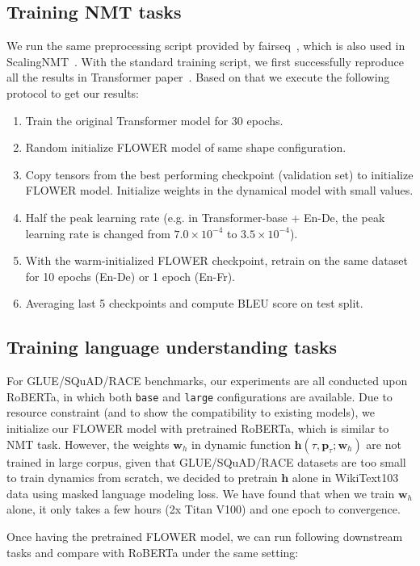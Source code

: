 \documentclass[11pt]{article}
\def\vh{{\bm{h}}}
\def\vp{{\bm{p}}}
\def\vw{{\bm{w}}}
\begin{document}
\subsection{Training NMT tasks}
We run the same preprocessing script provided by fairseq~\cite{ott2019fairseq}, which is also used in ScalingNMT~\cite{ott2018scaling}. With the standard training script, we first successfully reproduce all the results in Transformer paper~\cite{vaswani2017attention}. Based on that we execute the following protocol to get our results:
\begin{enumerate}
    \item Train the original Transformer model for 30 epochs.
    \item Random initialize FLOWER model of same shape configuration. 
    \item Copy tensors from the best performing checkpoint (validation set) to initialize FLOWER model. Initialize weights in the dynamical model with small values.
    \item Half the peak learning rate (e.g. in Transformer-base + En-De, the peak learning rate is changed from $7.0\times 10^{-4}$ to $3.5\times 10^{-4}$).
    \item With the warm-initialized FLOWER checkpoint, retrain on the same dataset for 10 epochs (En-De) or 1 epoch (En-Fr). 
    \item Averaging last 5 checkpoints and compute BLEU score on test split.
\end{enumerate}


\subsection{Training language understanding tasks}
For GLUE/SQuAD/RACE benchmarks, our experiments are all conducted upon RoBERTa, in which both \texttt{base} and \texttt{large} configurations are available. Due to resource constraint (and to show the compatibility to existing models), we initialize our FLOWER model with pretrained RoBERTa, which is similar to NMT task. However, the weights $\vw_h$ in dynamic function $\vh(\tau, \vp_{\tau};\vw_h)$ are not trained in large corpus, given that GLUE/SQuAD/RACE datasets are too small to train dynamics from scratch, we decided to pretrain $\vh$ alone in WikiText103~\cite{merity2016pointer} data using masked language modeling loss. We have found that when we train $\vw_h$ alone, it only takes a few hours (2x Titan V100) and one epoch to convergence. 
\par
Once having the pretrained FLOWER model, we can run following downstream tasks and compare with RoBERTa under the same setting:
\end{document}
